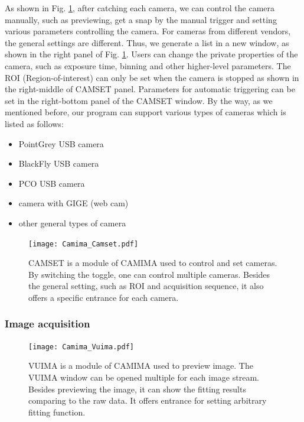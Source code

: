 As shown in Fig. \ref{Camima_Camset}, after catching each camera, we can control the camera manually, such as previewing, get a snap by the manual trigger and setting various parameters controlling the camera. For cameras from different vendors, the general settings are different. Thus, we generate a list in a new window, as shown in the right panel of Fig. \ref{Camima_Camset}. Users can change the private properties of the camera, such as exposure time, binning and other higher-level parameters. The ROI (Region-of-interest) can only be set when the camera is stopped as shown in the right-middle of CAMSET panel. Parameters for automatic triggering can be set in the right-bottom panel of the CAMSET window. By the way, as we mentioned before, our program can support various types of cameras which is listed as follows:

\begin{itemize}[noitemsep,topsep=0pt]
    \item PointGrey USB camera
    \item BlackFly USB camera
    \item PCO USB camera
    \item camera with GIGE (web cam)
    \item other general types of camera
\end{itemize}

\begin{figure}[htb]
\begin{center}
\texttt{[image: Camima\_Camset.pdf]}
\end{center}
\caption[CAMSET: a module of CAMIMA used to control and set cameras]{CAMSET is a module of CAMIMA used to control and set cameras. By switching the toggle, one can control multiple cameras. Besides the general setting, such as ROI and acquisition sequence, it also offers a specific entrance for each camera.}
\label{Camima_Camset}
\end{figure}

\subsubsection{Image acquisition}

\begin{figure}[htb]
\begin{center}
\texttt{[image: Camima\_Vuima.pdf]}
\end{center}
\caption[VUIMA: a module of CAMIMA used to preview image]{VUIMA is a module of CAMIMA used to preview image. The VUIMA window can be opened multiple for each image stream. Besides previewing the image, it can show the fitting results comparing to the raw data. It offers entrance for setting arbitrary fitting function.}
\label{Camima_Vuima}
\end{figure}

